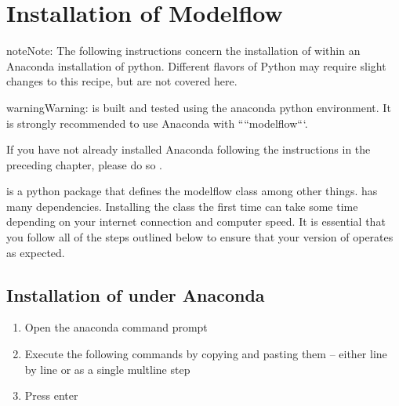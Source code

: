 \documentclass[letterpaper,10pt,english]{jupyterBook}
\begin{document}
\sphinxstepscope


\chapter{Installation of Modelflow}
\label{\detokenize{content/03_Installation/InstallingModelFlow:installation-of-modelflow}}\label{\detokenize{content/03_Installation/InstallingModelFlow::doc}}
\begin{sphinxadmonition}{note}{Note:}
\sphinxAtStartPar
The following instructions concern the installation of  within an Anaconda installation of python.  Different flavors of Python may require slight changes to this recipe, but are not covered here.
\end{sphinxadmonition}

\begin{sphinxadmonition}{warning}{Warning:}
\sphinxAtStartPar
{} is built and tested using the anaconda python environment.  It is strongly recommended to use Anaconda with ````modelflow```.

\sphinxAtStartPar
If you have not already installed Anaconda following the instructions in the preceding chapter, please do so .
\end{sphinxadmonition}

\sphinxAtStartPar
{} is a python package that defines the modelflow class  among other things.   has many dependencies. Installing the class the first time can take some time depending on your internet connection and computer speed.  It is essential that you follow all of the steps outlined below to ensure that your version of  operates as expected.


\section{Installation of  under Anaconda}
\label{\detokenize{content/03_Installation/InstallingModelFlow:installation-of-modelflow-under-anaconda}}\begin{enumerate}
%
\item {} 
\sphinxAtStartPar
Open the anaconda command prompt

\item {} 
\sphinxAtStartPar
Execute the following commands by copying and pasting them – either line by line or as a single mult\sphinxhyphen{}line step

\item {} 
\sphinxAtStartPar
Press enter

\end{enumerate}
\end{document}
